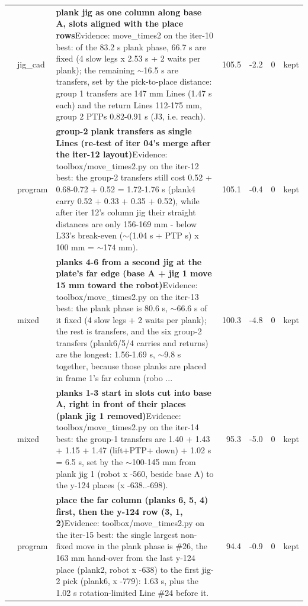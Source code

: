 {\begin{longtable}{>{\raggedleft}p{5mm} p{12mm} >{\raggedright}p{85mm} r r r p{14mm}}
12 & jig\_cad & \textbf{plank jig as one column along base A, slots aligned with the place rows}\newline Evidence: move\_times2 on the iter-10 best: of the 83.2 s plank phase, 66.7 s are fixed (4 slow legs x 2.53 s + 2 waits per plank); the remaining $\sim$16.5 s are transfers, set by the pick-to-place distance: group 1 transfers are 147 mm Lines (1.47 s each) and the return Lines 112-175 mm, group 2 PTPs 0.82-0.91 s (J3, i.e. reach). & 105.5 & -2.2 & 0 & kept \\
13 & program & \textbf{group-2 plank transfers as single Lines (re-test of iter 04's merge after the iter-12 layout)}\newline Evidence: toolbox/move\_times2.py on the iter-12 best: the group-2 transfers still cost 0.52 + 0.68-0.72 + 0.52 = 1.72-1.76 s (plank4 carry 0.52 + 0.33 + 0.35 + 0.52), while after iter 12's column jig their straight distances are only 156-169 mm - below L33's break-even ($\sim$(1.04 s + PTP s) x 100 mm = $\sim$174 mm). & 105.1 & -0.4 & 0 & kept \\
14 & mixed & \textbf{planks 4-6 from a second jig at the plate's far edge (base A + jig 1 move 15 mm toward the robot)}\newline Evidence: toolbox/move\_times2.py on the iter-13 best: the plank phase is 80.6 s, $\sim$66.6 s of it fixed (4 slow legs + 2 waits per plank); the rest is transfers, and the six group-2 transfers (plank6/5/4 carries and returns) are the longest: 1.56-1.69 s, $\sim$9.8 s together, because those planks are placed in frame 1's far column (robo ... & 100.3 & -4.8 & 0 & kept \\
15 & mixed & \textbf{planks 1-3 start in slots cut into base A, right in front of their places (plank jig 1 removed)}\newline Evidence: toolbox/move\_times2.py on the iter-14 best: the group-1 transfers are 1.40 + 1.43 + 1.15 + 1.47 (lift+PTP+ down) + 1.02 s = 6.5 s, set by the $\sim$100-145 mm from plank jig 1 (robot x -560, beside base A) to the y-124 places (x -638..-698). & 95.3 & -5.0 & 0 & kept \\
16 & program & \textbf{place the far column (planks 6, 5, 4) first, then the y-124 row (3, 1, 2)}\newline Evidence: toolbox/move\_times2.py on the iter-15 best: the single largest non-fixed move in the plank phase is \#26, the 163 mm hand-over from the last y-124 place (plank2, robot x -638) to the first jig-2 pick (plank6, x -779): 1.63 s, plus the 1.02 s rotation-limited Line \#24 before it. & 94.4 & -0.9 & 0 & kept \\

\end{longtable}}
